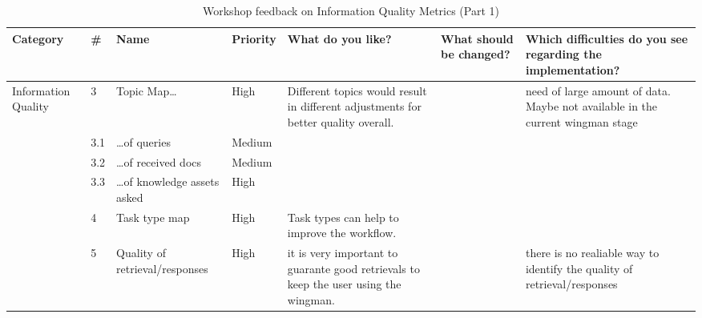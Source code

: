 \documentclass[
	english,
	ruledheaders=section,%
	class=report,%
	thesis={type=bachelor},%
	accentcolor=1b,%
	custommargins=true,%
	marginpar=false,%
	parskip=half-,%
	fontsize=11pt,%
	DIV=14,
]{tudapub}
\begin{document}
\begin{table}
    \centering
    \small 
    \caption{Workshop feedback on Information Quality Metrics (Part 1)}
    \label{tab:info_quality_p1}
    \begin{tabularx}{\textheight}{p{2.2cm} l >{\RaggedRight\arraybackslash}X l >{\RaggedRight\arraybackslash}X >{\RaggedRight\arraybackslash}X >{\RaggedRight\arraybackslash}X}
        \toprule
        \textbf{Category} & \textbf{\#} & \textbf{Name} & \textbf{Priority} & \textbf{What do you like?} & \textbf{What should be changed?} & \textbf{Which difficulties do you see regarding the implementation?} \\
        \midrule
        \multirow{6}{=}{Information Quality} 
        & 3 & Topic Map\dots & High & Different topics would result in different adjustments for better quality overall. & & need of large amount of data. Maybe not available in the current wingman stage \\
        \cmidrule(l){2-7}
        & 3.1 & \dots of queries & Medium & & & \\
        \cmidrule(l){2-7}
        & 3.2 & \dots of received docs & Medium & & & \\
        \cmidrule(l){2-7}
        & 3.3 & \dots of knowledge assets asked & High & & & \\
        \cmidrule(l){2-7}
        & 4 & Task type map & High & Task types can help to improve the workflow. & & \\
        \cmidrule(l){2-7}
        & 5 & Quality of retrieval/responses & High & it is very important to guarante good retrievals to keep the user using the wingman. & & there is no realiable way to identify the quality of retrieval/responses \\
        \bottomrule
    \end{tabularx}
\end{table}
\end{document}
